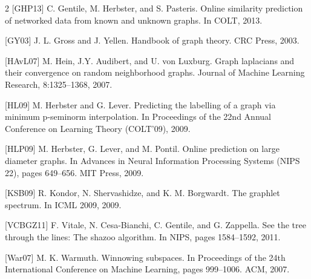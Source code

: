 \documentclass[10pt]{article}
\begin{document}
\begin{multicols}{2}
    [GHP13] C. Gentile, M. Herbster, and S. Pasteris. Online similarity prediction of networked data from known and unknown graphs. In COLT, 2013.

    [GY03] J. L. Gross and J. Yellen. Handbook of graph theory. CRC Press, 2003.

    [HAvL07] M. Hein, J.Y. Audibert, and U. von Luxburg. Graph laplacians and their convergence on random neighborhood graphs. Journal of Machine Learning Research, 8:1325–1368, 2007.

    [HL09] M. Herbster and G. Lever. Predicting the labelling of a graph via minimum p-seminorm interpolation. In Proceedings of the 22nd Annual Conference on Learning Theory (COLT’09), 2009.

    [HLP09] M. Herbster, G. Lever, and M. Pontil. Online prediction on large diameter graphs. In Advances in Neural Information Processing Systems (NIPS 22), pages 649–656. MIT Press, 2009.

    [KSB09] R. Kondor, N. Shervashidze, and K. M. Borgwardt. The graphlet spectrum. In ICML 2009, 2009.

    [VCBGZ11] F. Vitale, N. Cesa-Bianchi, C. Gentile, and G. Zappella. See the tree through the lines: The shazoo algorithm. In NIPS, pages 1584–1592, 2011.

    [War07] M. K. Warmuth. Winnowing subspaces. In Proceedings of the 24th International Conference on Machine Learning, pages 999–1006. ACM, 2007.


\end{multicols}
\end{document}

